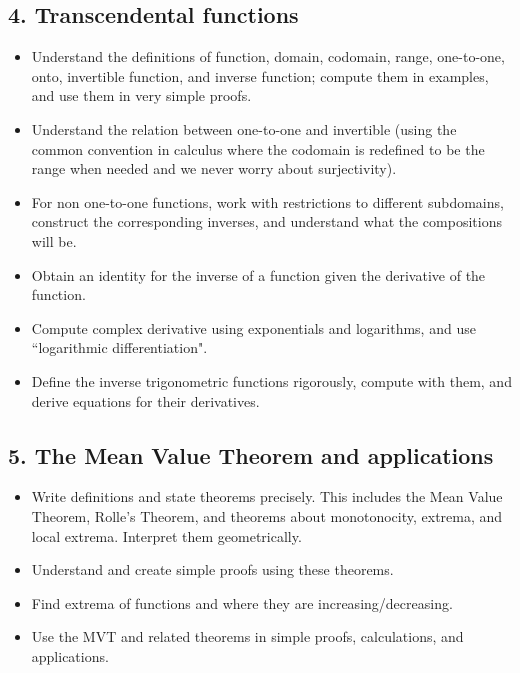 \documentclass[11pt]{article}
\begin{document}
	\subsection{4. Transcendental functions}

	\begin{itemize}
		\item Understand the definitions of function, domain, codomain, range, one-to-one,
			onto, invertible function, and inverse function; compute them in examples,
			and use them in very simple proofs.

		\item Understand the relation between one-to-one and invertible (using the
			common convention in calculus where the codomain is redefined to be the
			range when needed and we never worry about surjectivity).

		\item For non one-to-one functions, work with restrictions to different
			subdomains, construct the corresponding inverses, and understand what the
			compositions will be.

		\item Obtain an identity for the inverse of a function given the derivative of
			the function.

		\item Compute complex derivative using exponentials and logarithms, and use
			``logarithmic differentiation".

		\item Define the inverse trigonometric functions rigorously, compute with
			them, and derive equations for their derivatives.
	\end{itemize}

	\subsection{5. The Mean Value Theorem and applications}

	\begin{itemize}
		\item Write definitions and state theorems precisely. This includes the Mean
			Value Theorem, Rolle's Theorem, and theorems about monotonocity, extrema,
			and local extrema. Interpret them geometrically.

		\item Understand and create simple proofs using these theorems.

		\item Find extrema of functions and where they are increasing/decreasing.

		\item Use the MVT and related theorems in simple proofs, calculations, and applications.
	\end{itemize}
\end{document}
